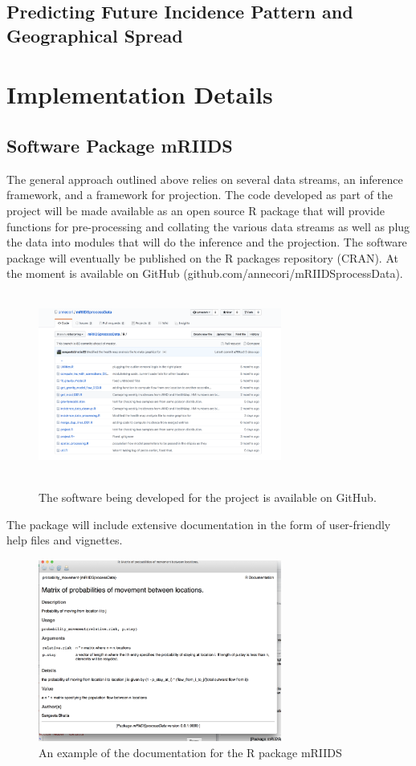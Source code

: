 \documentclass[11pt,]{article}
\begin{document}
\subsection{Predicting Future Incidence Pattern and Geographical Spread}

\section{Implementation Details}
\subsection{Software Package mRIIDS}

The general approach outlined above relies on several data streams, an
inference framework, and a framework for projection. The code
developed as part of the project will be made available as an open
source R package that will provide functions for pre-processing and
collating the various data streams as well as plug the data into
modules that will do the inference and the projection. The software
package will eventually be published on the R packages repository
(CRAN). At the moment is available on GitHub (github.com/annecori/mRIIDSprocessData).

\begin{figure}
   \centering
  \includegraphics[width=8cm, height = 6cm]{ms6-figures/github-screenshot}
  \label{fig:github}
  \caption{The software being developed for the project is available
    on GitHub.}
\end{figure}


The package will include extensive documentation in the form of
user-friendly help files and vignettes.


\begin{figure}
  \centering
  \includegraphics[width=8cm, height = 6cm]{ms6-figures/Helpfile-screenshot}
  \caption{An example of the documentation for the R package mRIIDS}
  \label{fig:helpfile}
\end{figure}
\end{document}
